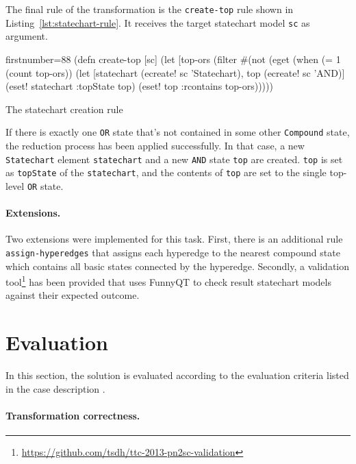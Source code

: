\documentclass[submission]{eptcs}
\begin{document}
The final rule of the transformation is the \verb|create-top| rule shown in
Listing~\ref{lst:statechart-rule}.  It receives the target statechart model
\verb|sc| as argument.

\begin{listing}[H]
  \begin{clojurecode*}{firstnumber=88}
(defn create-top [sc]
  (let [top-ors (filter #(not (eget %
    (when (= 1 (count top-ors))
      (let [statechart (ecreate! sc 'Statechart), top (ecreate! sc 'AND)]
        (eset! statechart :topState top)
        (eset! top :rcontains top-ors)))))
  \end{clojurecode*}
  \label{lst:statechart-rule}
  \caption{The statechart creation rule}
\end{listing}

If there is exactly one \verb|OR| state that's not contained in some other
\verb|Compound| state, the reduction process has been applied successfully.  In
that case, a new \verb|Statechart| element \verb|statechart| and a new
\verb|AND| state \verb|top| are created.  \verb|top| is set as \verb|topState|
of the \verb|statechart|, and the contents of \verb|top| are set to the single
top-level \verb|OR| state.


\paragraph{Extensions.}
\label{sec:extensions}

Two extensions were implemented for this task.  First, there is an additional
rule \verb|assign-hyperedges| that assigns each hyperedge to the nearest
compound state which contains all basic states connected by the hyperedge.
Secondly, a validation
tool\footnote{\url{https://github.com/tsdh/ttc-2013-pn2sc-validation}} has been
provided that uses FunnyQT to check result statechart models against their
expected outcome.

\section{Evaluation}
\label{sec:evaluation}

In this section, the solution is evaluated according to the evaluation criteria
listed in the case description \cite{pn2sccasedesc}.

\paragraph{Transformation correctness.}
\end{document}
